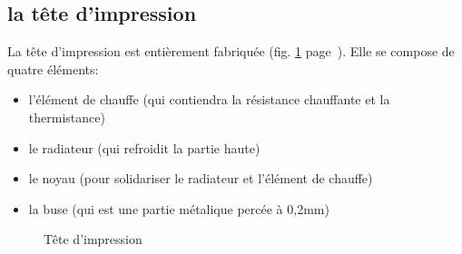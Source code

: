 \subsection{la tête d'impression}
La tête d'impression est entièrement fabriquée (fig. \ref{tete_impression} %
page~\pageref{tete_impression}). Elle se compose de quatre éléments:%
\begin{itemize}%
\item{l'élément de chauffe (qui contiendra la résistance chauffante et la thermistance)}%
\item{le radiateur (qui refroidit la partie haute)}%
\item{le noyau (pour solidariser le radiateur et l'élément de chauffe)}%
\item{la buse (qui est une partie métalique percée à 0,2mm)}%
\end{itemize}%
\begin{figure}%
   \caption{\label{tete_impression} Tête d'impression}%
\end{figure}%
